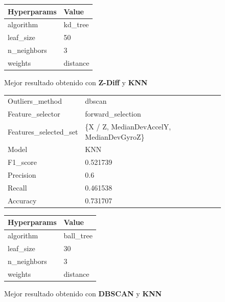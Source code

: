 \begin{appendices}
\begin{figure}[htb]
			\begin{tabular}{ll}
				\toprule
				Hyperparams &    Value \\
				\midrule
				  algorithm &  kd\_tree \\
				  leaf\_size &       50 \\
				n\_neighbors &        3 \\
					weights & distance \\
				\bottomrule
			\end{tabular}
			\caption{Mejor resultado obtenido con \textbf{Z-Diff} y \textbf{KNN}}
			\label{table:14}
		\end{figure}

		\begin{figure}[htb]
			\centering
			\begin{tabular}{ll}
				\toprule
					  Outliers\_method &                                   dbscan \\
					 Feature\_selector &                        forward\_selection \\
				Features\_selected\_set & \{X / Z, MedianDevAccelY, MedianDevGyroZ\} \\
								Model &                                      KNN \\
						F1\_score &                                 0.521739 \\
					   Precision &                                      0.6 \\
						  Recall &                                 0.461538 \\
						Accuracy &                                 0.731707 \\
				\bottomrule
			\end{tabular}
			\newline
			\newline

			\begin{tabular}{ll}
				\toprule
				Hyperparams &     Value \\
				\midrule
				  algorithm & ball\_tree \\
				  leaf\_size &        30 \\
				n\_neighbors &         3 \\
					weights &  distance \\
				\bottomrule
			\end{tabular}
			\caption{Mejor resultado obtenido con \textbf{DBSCAN} y \textbf{KNN}}
			\label{table:12}
		\end{figure}


\end{appendices}
